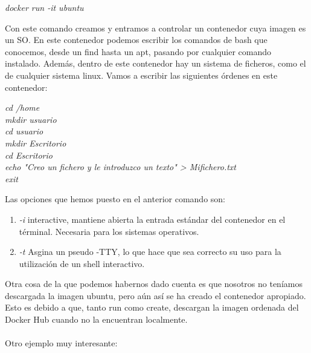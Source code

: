 \documentclass[]{article}
\begin{document}
\begin{center}

	\it	docker run -it ubuntu
	
\end{center}

Con este comando creamos y entramos a controlar un contenedor cuya imagen es un SO. En este contenedor podemos escribir los comandos de bash que conocemos, desde un find hasta un apt, pasando por cualquier comando instalado. Además, dentro de este contenedor hay un sistema de ficheros, como el de cualquier sistema linux. Vamos a escribir las siguientes órdenes en este contenedor:
\begin{center}
	
	\it
	cd /home\\
	mkdir usuario\\
	cd usuario\\
	mkdir Escritorio\\
	cd Escritorio\\
	echo "Creo un fichero y le introduzco un texto" > Mifichero.txt\\
	exit

\end{center}
Las opciones que hemos puesto en el anterior comando son:
\begin{enumerate}
\renewcommand{\labelenumi}{$ \bullet $}

\item {\it -i} interactive, mantiene abierta la entrada estándar del contenedor en el términal. Necesaria para los sistemas operativos.
\item {\it -t} Asgina un pseudo -TTY, lo que hace que sea correcto su uso para la utilización de un shell interactivo.

\end{enumerate}
Otra cosa de la que podemos habernos dado cuenta es que nosotros no teníamos descargada la imagen ubuntu, pero aún así se ha creado el contenedor apropiado.
Esto es debido a que, tanto run como create, descargan la imagen ordenada del Docker Hub cuando no la encuentran localmente.
\\\\

Otro ejemplo muy interesante:
\end{document}
